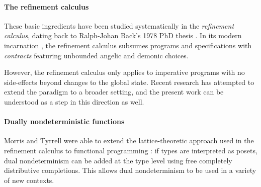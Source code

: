 \documentclass[draft,11pt]{report}
\begin{document}

\paragraph{The refinement calculus} %

These basic ingredients have been studied systematically
in the \emph{refinement calculus},
dating back to Ralph-Johan Back's 1978 PhD thesis \cite{backthesis}.
In its modern incarnation \cite{refcal},
the refinement calculus
subsumes programs and specifications with \emph{contracts}
featuring unbounded angelic and demonic choices.



However,
the refinement calculus only applies to imperative programs
with no side-effects beyond changes to the global state.
Recent research has attempted to extend the paradigm
to a broader setting,
and the present work can be understood
as a step in this direction as well.


\paragraph{Dually nondeterministic functions} %

Morris and Tyrrell were able to extend
the lattice-theoretic approach used in the refinement calculus
to functional programming
\cite{augtyp,dndf,cspdnd}:
if types are interpreted as posets,
dual nondeterminism can be added at the type level
using free completely distributive completions.
This allows dual nondeterminism to be used
in a variety of new contexts.
\end{document}

